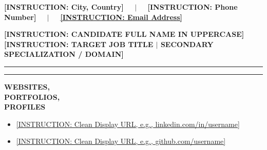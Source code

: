 \documentclass[10pt,a4paper]{article}
\newcommand{\sectionline}{%
  \vspace{4pt}%
  \noindent%
  \begin{minipage}[b]{3.5cm}%
    \color{bannerblue}\rule{\linewidth}{4.5pt}%
  \end{minipage}%
  \hspace{0.3cm}%
  \begin{minipage}[b]{\dimexpr\textwidth-3.8cm\relax}%
    \color{dividerblue}\rule{\linewidth}{1.2pt}%
  \end{minipage}%
  \par \vspace{4pt}%
}
\newcommand{\cvblock}[2]{%
  \vspace{2pt}%
  \noindent%
  \begin{minipage}[t]{3.5cm}%
    \raggedright \bfseries \small \color{textdark} #1%
  \end{minipage}%
  \hspace{0.3cm}%
  \begin{minipage}[t]{\dimexpr\textwidth-3.8cm\relax}%
    \small \color{textdark} #2%
  \end{minipage}%
  \par \vspace{3pt}%
}
\begin{document}
\color{textdark}

\begin{tcolorbox}[
  colback=bannerblue,
  colframe=bannerblue,
  arc=0mm,
  boxrule=0pt,
  top=5pt,
  bottom=5pt,
  left=10pt,
  right=10pt,
  halign=center
]
  \small \bfseries \color{textdark}
  [INSTRUCTION: City, Country] \ \ $|$ \ \ [INSTRUCTION: Phone Number] \ \ $|$ \ \ \href{mailto:[INSTRUCTION: Email Address]}{[INSTRUCTION: Email Address]}
\end{tcolorbox}

\vspace{5pt}

\noindent
{\LARGE \textbf{[INSTRUCTION: CANDIDATE FULL NAME IN UPPERCASE]}}\\[3pt]
{\small \textbf{\color{darkblue}[INSTRUCTION: TARGET JOB TITLE $|$ SECONDARY SPECIALIZATION / DOMAIN]}}

\vspace{6pt}

\sectionline
\cvblock{WEBSITES,\\PORTFOLIOS,\\PROFILES}{%
  \begin{itemize}
    \item \href{[INSTRUCTION: Full URL to LinkedIn Profile]}{[INSTRUCTION: Clean Display URL, e.g., linkedin.com/in/username]}
    \item \href{[INSTRUCTION: Full URL to GitHub Profile]}{[INSTRUCTION: Clean Display URL, e.g., github.com/username]}
  \end{itemize}
}
\end{document}
